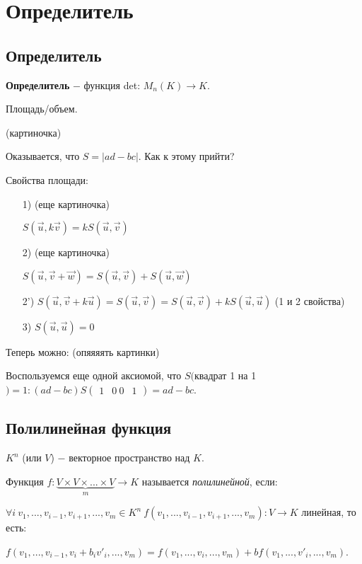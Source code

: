\section{Определитель}
\subsection{Определитель}

\begin{definition}
    \textbf{Определитель} $-$ функция det: $M_n(K)\rightarrow K$.
\end{definition}

\begin{example}
    Площадь/объем.

    (картиночка)

    Оказывается, что $S=|ad-bc|$. Как к этому прийти?

    Свойства площади:
    \begin{enumerate}
        \item[1)] (еще картиночка)

        $S(\Vec{u}, k\Vec{v})=kS(\Vec{u}, \Vec{v})$

        \item[2)] (еще картиночка)

        $S(\Vec{u}, \Vec{v}+\Vec{w})=S(\Vec{u}, \Vec{v})+S(\Vec{u}, \Vec{w})$

        \item[2')] $S(\Vec{u}, \Vec{v}+ k\Vec{u})=S(\Vec{u}, \Vec{v})=S(\Vec{u}, \Vec{v})+kS(\Vec{u}, \Vec{u})$ (1 и 2 свойства)

        \item[3)] $S(\Vec{u}, \Vec{u})=0$

    \end{enumerate}

    Теперь можно: (опяяяять картинки)

    Воспользуемся еще одной аксиомой, что $S($квадрат 1 на 1$)=1:(ad-bc)S\begin{pmatrix}
                                                                             1 & 0 \ 0 & 1
    \end{pmatrix}=ad-bc$.
\end{example}

\subsection{Полилинейная функция}
\begin{definition}
    $K^n$ (или $V$) $-$ векторное пространство над $K$.

    Функция $f:\underbrace{V\times V\times ... \times V}_{m}\rightarrow K$ называется \textit{полилинейной}, если:

    $\forall i\ v_{1},...,v_{i-1}, v_{i+1},...,v_m\in K^n\ f(v_{1},...,v_{i-1}, v_{i+1},...,v_m):V\rightarrow K$ линейная, то есть:

    $f(v_{1},...,v_{i-1}, v_i+b_iv'_i,...,v_m)=f(v_{1},...,v_{i},...,v_m)+bf(v_{1},...,v'_{i},...,v_m)$.
\end{definition}

